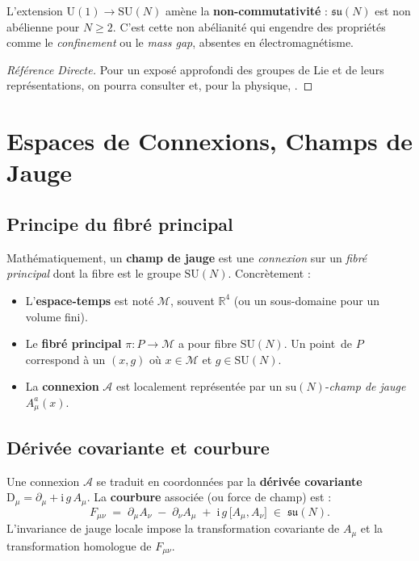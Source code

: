 L’extension \(\mathrm{U}(1)\to \mathrm{SU}(N)\) amène la \textbf{non-commutativité} : \(\mathfrak{su}(N)\) est non abélienne pour \(N\ge2\). C’est cette non abélianité qui engendre des propriétés comme le \emph{confinement} ou le \emph{mass gap}, absentes en électromagnétisme.

\begin{proof}[Référence Directe]
	Pour un exposé approfondi des groupes de Lie et de leurs représentations, on pourra consulter \cite{Knapp2002,Hall2015} et, pour la physique, \cite{Georgi1999}.
\end{proof}

\section{Espaces de Connexions, Champs de Jauge}
\label{sec:3.2}

\subsection*{Principe du fibré principal}
Mathématiquement, un \textbf{champ de jauge} est une \emph{connexion} sur un \emph{fibré principal} dont la fibre est le groupe \(\mathrm{SU}(N)\). Concrètement :
\begin{itemize}
	\item L’\textbf{espace-temps} est noté \(\mathcal{M}\), souvent \(\mathbb{R}^4\) (ou un sous-domaine pour un volume fini).
	\item Le \textbf{fibré principal} \(\pi: P \to \mathcal{M}\) a pour fibre \(\mathrm{SU}(N)\). Un \og point\fg\ de \(P\) correspond à un \((x, g)\) où \(x\in \mathcal{M}\) et \(g\in \mathrm{SU}(N)\).
	\item La \textbf{connexion} \(\mathcal{A}\) est localement représentée par un \(\mathrm{su}(N)\)-\emph{champ de jauge} \(A_\mu^a(x)\).
\end{itemize}

\subsection*{Dérivée covariante et courbure}
Une connexion \(\mathcal{A}\) se traduit en coordonnées par la \textbf{dérivée covariante} \(\mathrm{D}_\mu = \partial_\mu + \mathrm{i}\,g\,A_\mu\). La \textbf{courbure} associée (ou force de champ) est :
\[
F_{\mu\nu} \;=\; \partial_\mu A_\nu \;-\; \partial_\nu A_\mu \;+\; \mathrm{i}\,g\,\bigl[A_\mu, A_\nu\bigr] \;\in\;\mathfrak{su}(N).
\]
L’invariance de jauge locale impose la transformation covariante de \(A_\mu\) et la transformation homologue de \(F_{\mu\nu}\).

